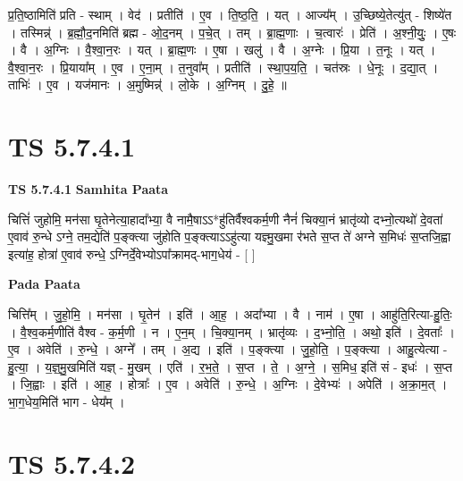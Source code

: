 \documentclass[17pt]{extarticle}
\begin{document}
प्र॒ति॒ष्ठामिति॑ प्रति - स्थाम् । वेद॑ । प्रतीति॑ । ए॒व । ति॒ष्ठ॒ति॒ । यत् । आज्य᳚म् । उ॒च्छिष्ये॒तेत्यु॑त् - शिष्ये॑त । तस्मिन्न्॑ । ब्र॒ह्मौ॒द॒नमिति॑ ब्रह्म - ओ॒द॒नम् । प॒चे॒त् । तम् । ब्रा॒ह्म॒णाः । च॒त्वारः॑ । प्रेति॑ । अ॒श्नी॒युः॒ । ए॒षः । वै । अ॒ग्निः । वै॒श्वा॒न॒रः । यत् । ब्रा॒ह्म॒णः । ए॒षा । खलु॑ । वै । अ॒ग्नेः । प्रि॒या । त॒नूः । यत् । वै॒श्वा॒न॒रः । प्रि॒याया᳚म् । ए॒व । ए॒ना॒म् । त॒नुवा᳚म् । प्रतीति॑ । स्था॒प॒य॒ति॒ । चत॑स्रः । धे॒नूः । द॒द्या॒त् । ताभिः॑ । ए॒व । यज॑मानः । अ॒मुष्मिन्न्॑ । लो॒के । अ॒ग्निम् । दु॒हे॒ ॥  \newline




\section*{ TS 5.7.4.1 }

\textbf{TS 5.7.4.1 } \newline
\textbf{Samhita Paata} \newline

चित्तिं॑ जुहोमि॒ मन॑सा घृ॒तेनेत्या॒हादा᳚भ्या॒ वै नामै॒षाऽऽ*हु॑तिर्वैश्वकर्म॒णी नैनं॑ चिक्या॒नं भ्रातृ॑व्यो दभ्नो॒त्यथो॑ दे॒वता॑ ए॒वाव॑ रु॒न्धे ऽग्ने॒ तम॒द्येति॑ प॒ङ्क्त्या जु॑होति प॒ङ्क्त्याऽऽहु॑त्या यज्ञ्मु॒खमा र॑भते स॒प्त ते॑ अग्ने स॒मिधः॑ स॒प्तजि॒ह्वा इत्या॑ह॒ होत्रा॑ ए॒वाव॑ रुन्धे॒ ऽग्निर्दे॒वेभ्योऽपा᳚क्रामद्-भाग॒धेय॑ - [  ] \newline

\textbf{Pada Paata} \newline

चित्ति᳚म् । जु॒हो॒मि॒ । मन॑सा । घृ॒तेन॑ । इति॑ । आ॒ह॒ । अदा᳚भ्या । वै । नाम॑ । ए॒षा । आहु॑ति॒रित्या-हु॒तिः॒ । वै॒श्व॒कर्म॒णीति॑ वैश्व - क॒र्म॒णी । न । ए॒न॒म् । चि॒क्या॒नम् । भ्रातृ॑व्यः । द॒भ्नो॒ति॒ । अथो॒ इति॑ । दे॒वताः᳚ । ए॒व । अवेति॑ । रु॒न्धे॒ । अग्ने᳚ । तम् । अ॒द्य । इति॑ । प॒ङ्क्त्या । जु॒हो॒ति॒ । प॒ङ्क्त्या । आहु॒त्येत्या - हु॒त्या॒ । य॒ज्ञ्॒मु॒खमिति॑ यज्ञ् - मु॒खम् । एति॑ । र॒भ॒ते॒ । स॒प्त । ते॒ । अ॒ग्ने॒ । स॒मिध॒ इति॑ सं - इधः॑ । स॒प्त । जि॒ह्वाः । इति॑ । आ॒ह॒ । होत्राः᳚ । ए॒व । अवेति॑ । रु॒न्धे॒ । अ॒ग्निः । दे॒वेभ्यः॑ । अपेति॑ । अ॒क्रा॒म॒त् । भा॒ग॒धेय॒मिति॑ भाग - धेय᳚म् ।  \newline




\section*{ TS 5.7.4.2 }
\end{document}
